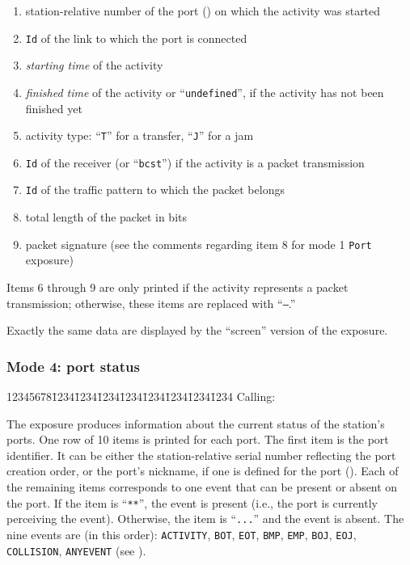 \begin{enumerate}
\item
station-relative number of the port ()
on which the activity was started
\item
{\tt Id} of the link to which the port is connected
\item
{\em starting time\/} of the activity
\item
{\em finished time\/} of the activity or ``{\tt undefined}'', if the
activity has not been finished yet
\item
activity type: ``{\tt T}'' for a transfer, ``{\tt J}'' for a jam
\item
{\tt Id} of the receiver (or ``{\tt bcst}'') if the activity is a packet
transmission
\item
{\tt Id} of the traffic pattern to which the packet belongs
\item
total length of the packet in bits
\item
packet signature (see the comments regarding item 8 for mode 1
{\tt Port} exposure)
\end{enumerate}

Items 6 through 9 are only printed if the activity represents a
packet transmission; otherwise, these items are replaced with ``{\tt ---}.''

Exactly the same data are displayed by the ``screen'' version of the
exposure.

\subsubsection*{Mode 4: port status}
{\tt\begin{tabbing}
12345678\=1234\=1234\=1234\=1234\=1234\=1234\=1234\=1234\kill
{\rm Calling:}
\end{tabbing}}

The exposure produces information about the current status of the station's
ports.
One row of 10 items is printed for each port.
The first item is the port identifier.
It can be either the station-relative serial number reflecting the port
creation order, or the port's nickname, if one is defined for the port
().
Each of the remaining items corresponds to one event that can be
present or absent on the port.
If the item is ``{\tt ***}'', the event is present (i.e., the port is
currently perceiving the event).
Otherwise, the item is ``{\tt ...}'' and the event is absent.
The nine events are (in this order): {\tt ACTIVITY}, {\tt BOT}, {\tt EOT},
{\tt BMP}, {\tt EMP}, {\tt BOJ}, {\tt EOJ}, {\tt COLLISION},
{\tt ANYEVENT} (see ).

